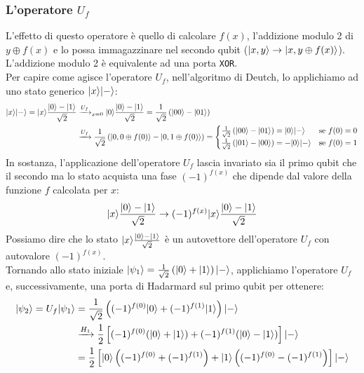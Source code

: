 \documentclass[12pt, a4paper]{report}
\begin{document}
\subsubsection{L'operatore $U_{f}$}
L'effetto di questo operatore è quello di calcolare $f(x)$, l'addizione modulo 2 di $y\oplus f(x)$ e lo possa immagazzinare nel secondo qubit ($| x,y \rangle\rightarrow| x,y\oplus f(x) \rangle$). L'addizione modulo 2 è equivalente ad una porta \texttt{XOR}.\\
Per capire come agisce l'operatore $U_{f}$, nell'algoritmo di Deutch, lo applichiamo ad uno stato generico $| x \rangle| - \rangle$:
\begin{equation*}
    \begin{split}
        | x \rangle| - \rangle = | x \rangle\frac{| 0 \rangle-| 1 \rangle}{\sqrt{2}} &\xrightarrow{U_{f}}_{x=0} | 0 \rangle\frac{| 0 \rangle-| 1 \rangle}{\sqrt{2}} = \frac{1}{\sqrt{2}}\left(| 00 \rangle-| 01 \rangle\right)\\
        &\xrightarrow{U_{f}} \frac{1}{\sqrt{2}}\left(| 0,0\oplus f(0) \rangle-| 0,1\oplus f(0) \rangle\right) = \begin{cases}
            \frac{1}{\sqrt{2}}\left(| 00 \rangle-| 01 \rangle\right) = | 0 \rangle| - \rangle & \text{se $f(0)=0$} \\
            \frac{1}{\sqrt{2}}\left(| 01 \rangle-| 00 \rangle\right) = -| 0 \rangle| - \rangle & \text{se $f(0)=1$}
        \end{cases}
    \end{split}
\end{equation*}
In sostanza, l'applicazione dell'operatore $U_{f}$ lascia invariato sia il primo qubit che il secondo ma lo stato acquista una fase $(-1)^{f(x)}$ che dipende dal  valore della funzione $f$ calcolata per $x$:
\begin{equation*}
    | x \rangle\frac{| 0 \rangle-| 1 \rangle}{\sqrt{2}}\rightarrow(-1)^{f(x)}| x \rangle\frac{| 0 \rangle-| 1 \rangle}{\sqrt{2}}
\end{equation*} 
Possiamo dire che lo stato $| x \rangle\frac{| 0 \rangle-| 1 \rangle}{\sqrt{2}}$ è un autovettore dell'operatore $U_{f}$ con autovalore $(-1)^{f(x)}$.\\
Tornando allo stato iniziale $| \psi_{1} \rangle = \frac{1}{\sqrt{2}}\left(| 0 \rangle+| 1 \rangle\right)| - \rangle$, applichiamo l'operatore $U_{f}$ e, successivamente, una porta di Hadarmard sul primo qubit per ottenere:
\begin{equation*}
    \begin{split}
        | \psi_{2} \rangle = U_{f}| \psi_{1} \rangle &= \frac{1}{\sqrt{2}}\left((-1)^{f(0)}| 0 \rangle+(-1)^{f(1)}| 1 \rangle\right)| - \rangle \\  
        &\xrightarrow{H_{1}} \frac{1}{2}\left[(-1)^{f(0)}(| 0 \rangle+| 1 \rangle)+(-1)^{f(1)}(| 0 \rangle-| 1 \rangle)\right]| - \rangle\\
        &=\frac{1}{2}\left[| 0 \rangle\left((-1)^{f(0)}+(-1)^{f(1)}\right)+| 1 \rangle\left((-1)^{f(0)}-(-1)^{f(1)}\right)\right]| - \rangle
    \end{split}
\end{equation*}
\end{document}
